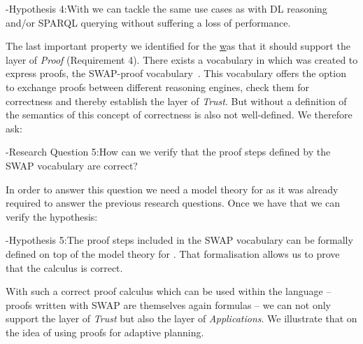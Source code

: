 \hyp{Hypothesis 4:}{With \nthreelogic %
we can tackle the same use cases as with \owl DL reasoning and/or SPARQL querying without suffering a loss of performance.
% 
}


The last important property we identified for the \ul was that it should support the layer of \emph{Proof} (Requirement 4).
There exists a vocabulary in \nthree which was created to express proofs, the SWAP-proof vocabulary~\cite{Proof}. %
This vocabulary offers the option to exchange proofs between different reasoning engines, check them for correctness and thereby establish the layer of \emph{Trust}.
But without a definition of the semantics of \nthree this concept of correctness is also not well-defined. 
We therefore ask:


\hyp{Research Question 5:}{How can we verify that the proof steps defined by the SWAP vocabulary are correct?}

In order to answer this question we need a model theory for \nthree as it was already required to answer the previous research questions. Once we have that we can
verify the hypothesis:

\hyp{Hypothesis 5:}{The proof steps included in the SWAP vocabulary can be formally defined on top of the model theory for \nthree. 
That formalisation allows us to prove that the calculus is correct.} 

With such a correct proof calculus which can be used within the language -- proofs written with SWAP are themselves again \nthree formulas -- we can not only 
support the layer of \emph{Trust} but also the layer of \emph{Applications}. %
We illustrate that on the idea of using \nthree proofs for adaptive planning.
% 
% 

